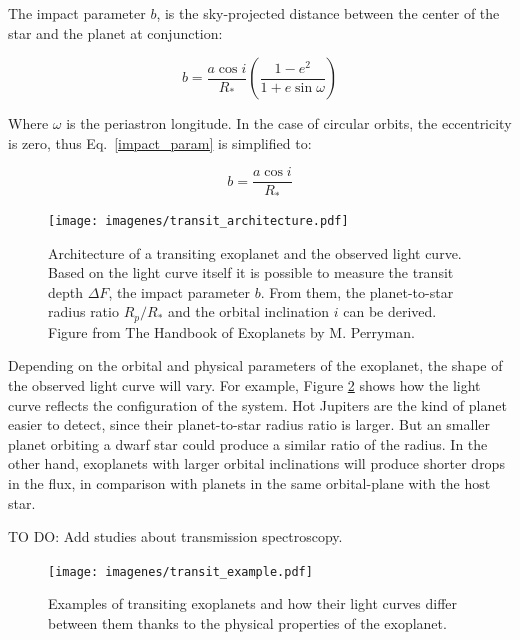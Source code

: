 The impact parameter $b$, is the sky-projected distance between the center of the star and the planet at conjunction:

\begin{equation}
    b = \frac{a\cos{i}}{R_{*}}\left(\frac{1-e^2}{1+e\sin{\omega}}\right)
\label{impact_param}
\end{equation}

Where $\omega$ is the periastron longitude. In the case of circular orbits, the eccentricity is zero, thus Eq.~\ref{impact_param} is simplified to:

\begin{equation}
    b = \frac{a\cos{i}}{R_{*}}
\label{impact_param_simple}
\end{equation}

\begin{figure}[H]
\centering
\texttt{[image: imagenes/transit\_architecture.pdf]}
\caption{Architecture of a transiting exoplanet and the observed light curve. Based on the light curve itself it is possible to measure the transit depth $\Delta F$, the impact parameter $b$. From them, the planet-to-star radius ratio $R_{p}/R_{*}$ and the orbital inclination $i$ can be derived. Figure from The Handbook of Exoplanets by M. Perryman.}
\label{transit}
\end{figure}

Depending on the orbital and physical parameters of the exoplanet, the shape of the observed light curve will vary. For example, Figure \ref{transit_examples} shows how the light curve reflects the configuration of the system. Hot Jupiters are the kind of planet easier to detect, since their planet-to-star radius ratio is larger. But an smaller planet orbiting a dwarf star could produce a similar ratio of the radius. In the other hand, exoplanets with larger orbital inclinations will produce shorter drops in the flux, in comparison with planets in the same orbital-plane with the host star.

TO DO: Add studies about transmission spectroscopy.            

\begin{figure}[H]
\centering
\texttt{[image: imagenes/transit\_example.pdf]}
\caption{Examples of transiting exoplanets and how their light curves differ between them thanks to the physical properties of the exoplanet.}
\label{transit_examples}
\end{figure}


